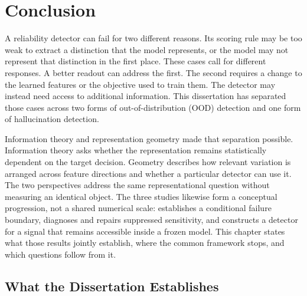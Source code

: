 \chapter{Conclusion}
\label{ch:conclusion}

A reliability detector can fail for two different reasons. Its scoring rule may
be too weak to extract a distinction that the model represents, or the model may
not represent that distinction in the first place. These cases call for different
responses. A better readout can address the first. The second requires a change to
the learned features or the objective used to train them. The detector may instead
need access to additional information. This dissertation has separated those cases
across two forms of out-of-distribution (OOD) detection and one form of
hallucination detection.

Information theory and representation geometry made that separation possible.
Information theory asks whether the representation remains statistically dependent
on the target decision. Geometry describes how relevant variation is arranged
across feature directions and whether a particular detector can use it.
The two perspectives address the same representational question without measuring
an identical object. The three studies likewise form a conceptual progression,
not a shared numerical scale:  establishes a conditional
failure boundary,  diagnoses and repairs
suppressed sensitivity, and  constructs a detector
for a signal that remains accessible inside a frozen model. This chapter states
what those results jointly establish, where the common framework stops, and which
questions follow from it.

\section{What the Dissertation Establishes}
\label{sec:concl:summary}

